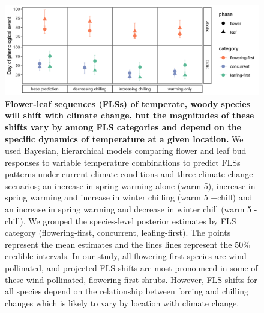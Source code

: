 \documentclass[11pt]{article}\usepackage[]{graphicx}\usepackage[]{color}
\begin{document}
\pagebreak
\begin{figure}[h!]
    \centering
 \includegraphics[width=\textwidth]{..//Plots/Flobuds_manuscript_figs/posteriorgroups_go.png}
    \caption{\textbf{Flower-leaf sequences (FLSs) of temperate, woody species will shift with climate change, but the magnitudes of these shifts vary by among FLS categories and depend on the specific dynamics of temperature at a given location.} We used Bayesian, hierarchical models comparing flower and leaf bud responses to variable temperature combinations to predict FLSs patterns under current climate conditions and three climate change scenarios;  an increase in spring warming alone (warm 5), increase in spring warming and increase in winter chilling (warm 5 +chill) and an increase in spring warming and decrease in winter chill (warm 5 -chill). We grouped the species-level posterior estimates by FLS category (flowering-first, concurrent, leafing-first). The points represent the mean estimates and the lines lines represent the 50\% credible intervals. In our study, all flowering-first species are wind-pollinated, and projected FLS shifts are most pronounced in some of these wind-pollinated, flowering-first shrubs. However, FLS shifts for all species depend on the relationship between forcing and chilling changes which is likely to vary by location with climate change.}
    \label{fig:preddy}
\end{figure}
\end{document}
